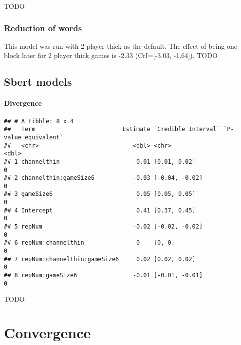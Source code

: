 \documentclass[
  english,
  a4paper,
]{article}
\begin{document}
TODO

\hypertarget{reduction-of-words}{%
\subsubsection{Reduction of words}\label{reduction-of-words}}

This model was run with 2 player thick as the default. The effect of being one block later for 2 player thick games is -2.33 (CrI={[}-3.03, -1.64{]}). TODO

\hypertarget{sbert-models}{%
\subsection{Sbert models}\label{sbert-models}}

\hypertarget{divergence-2}{%
\paragraph{Divergence}\label{divergence-2}}

\begin{verbatim}
## # A tibble: 8 x 4
##   Term                         Estimate `Credible Interval` `P-value equivalent`
##   <chr>                           <dbl> <chr>                              <dbl>
## 1 channelthin                      0.01 [0.01, 0.02]                           0
## 2 channelthin:gameSize6           -0.03 [-0.04, -0.02]                         0
## 3 gameSize6                        0.05 [0.05, 0.05]                           0
## 4 Intercept                        0.41 [0.37, 0.45]                           0
## 5 repNum                          -0.02 [-0.02, -0.02]                         0
## 6 repNum:channelthin               0    [0, 0]                                 0
## 7 repNum:channelthin:gameSize6     0.02 [0.02, 0.02]                           0
## 8 repNum:gameSize6                -0.01 [-0.01, -0.01]                         0
\end{verbatim}

TODO

\hypertarget{convergence-2}{%
\section{Convergence}\label{convergence-2}}
\end{document}
